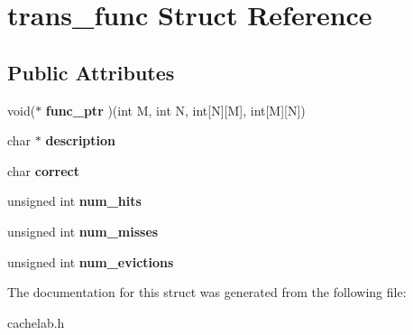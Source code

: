 \hypertarget{structtrans__func}{}\section{trans\+\_\+func Struct Reference}
\label{structtrans__func}
\subsection*{Public Attributes}
\begin{DoxyCompactItemize}
\item 
\mbox{\label{structtrans__func_a9eb74fa59edcbbbcbc31a8261801d30d}} 
void($\ast$ {\bfseries func\+\_\+ptr} )(int M, int N, int\mbox{[}N\mbox{]}\mbox{[}M\mbox{]}, int\mbox{[}M\mbox{]}\mbox{[}N\mbox{]})
\item 
\mbox{\label{structtrans__func_a036a8bb18395ae7ecbf6499b5b9787b4}} 
char $\ast$ {\bfseries description}
\item 
\mbox{\label{structtrans__func_ab953de51fbb9bca45e88b4b67dad76fb}} 
char {\bfseries correct}
\item 
\mbox{\label{structtrans__func_a0913689e5c4909a8d55be7d91cf30aa9}} 
unsigned int {\bfseries num\+\_\+hits}
\item 
\mbox{\label{structtrans__func_a35a6e442f86d40e16e3f5940eecd858a}} 
unsigned int {\bfseries num\+\_\+misses}
\item 
\mbox{\label{structtrans__func_a22c428d2995e89eeb0b7c74dedd31302}} 
unsigned int {\bfseries num\+\_\+evictions}
\end{DoxyCompactItemize}


The documentation for this struct was generated from the following file\+:\begin{DoxyCompactItemize}
\item 
cachelab.\+h\end{DoxyCompactItemize}

